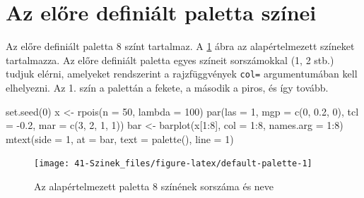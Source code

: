 \documentclass[
]{book}
\newenvironment{Shaded}{\begin{snugshade}}{\end{snugshade}}
\newcommand{\AttributeTok}[1]{\textcolor[rgb]{0.77,0.63,0.00}{#1}}
\newcommand{\DecValTok}[1]{\textcolor[rgb]{0.00,0.00,0.81}{#1}}
\newcommand{\FloatTok}[1]{\textcolor[rgb]{0.00,0.00,0.81}{#1}}
\newcommand{\FunctionTok}[1]{\textcolor[rgb]{0.00,0.00,0.00}{#1}}
\newcommand{\NormalTok}[1]{#1}
\newcommand{\OtherTok}[1]{\textcolor[rgb]{0.56,0.35,0.01}{#1}}
\newcommand{\SpecialCharTok}[1]{\textcolor[rgb]{0.00,0.00,0.00}{#1}}
\begin{document}
\hypertarget{az-elore-definialt}{%
\section{Az előre definiált paletta színei}\label{az-elore-definialt}}

Az előre definiált paletta 8 színt tartalmaz. A \ref{fig:default-palette} ábra az alapértelmezett színeket tartalmazza. Az előre definiált paletta egyes színeit sorszámokkal (1, 2 stb.) tudjuk elérni, amelyeket rendszerint a rajzfüggvények \texttt{col=} argumentumában kell elhelyezni. Az 1. szín a palettán a fekete, a második a piros, és így tovább.

\begin{Shaded}
\begin{Highlighting}[]
\FunctionTok{set.seed}\NormalTok{(}\DecValTok{0}\NormalTok{)}
\NormalTok{x }\OtherTok{\textless{}{-}} \FunctionTok{rpois}\NormalTok{(}\AttributeTok{n =} \DecValTok{50}\NormalTok{, }\AttributeTok{lambda =} \DecValTok{100}\NormalTok{)}
\FunctionTok{par}\NormalTok{(}\AttributeTok{las =} \DecValTok{1}\NormalTok{, }\AttributeTok{mgp =} \FunctionTok{c}\NormalTok{(}\DecValTok{0}\NormalTok{, }\FloatTok{0.2}\NormalTok{, }\DecValTok{0}\NormalTok{), }\AttributeTok{tcl =} \SpecialCharTok{{-}}\FloatTok{0.2}\NormalTok{, }\AttributeTok{mar =} \FunctionTok{c}\NormalTok{(}\DecValTok{3}\NormalTok{, }\DecValTok{2}\NormalTok{, }\DecValTok{1}\NormalTok{, }\DecValTok{1}\NormalTok{))}
\NormalTok{bar }\OtherTok{\textless{}{-}} \FunctionTok{barplot}\NormalTok{(x[}\DecValTok{1}\SpecialCharTok{:}\DecValTok{8}\NormalTok{], }\AttributeTok{col =} \DecValTok{1}\SpecialCharTok{:}\DecValTok{8}\NormalTok{, }\AttributeTok{names.arg =} \DecValTok{1}\SpecialCharTok{:}\DecValTok{8}\NormalTok{)}
\FunctionTok{mtext}\NormalTok{(}\AttributeTok{side =} \DecValTok{1}\NormalTok{, }\AttributeTok{at =}\NormalTok{ bar, }\AttributeTok{text =} \FunctionTok{palette}\NormalTok{(), }\AttributeTok{line =} \DecValTok{1}\NormalTok{)}
\end{Highlighting}
\end{Shaded}

\begin{figure}

{\centering \texttt{[image: 41-Szinek\_files/figure-latex/default-palette-1]} 

}

\caption{Az alapértelmezett paletta 8 színének sorszáma és neve}\label{fig:default-palette}
\end{figure}
\end{document}
